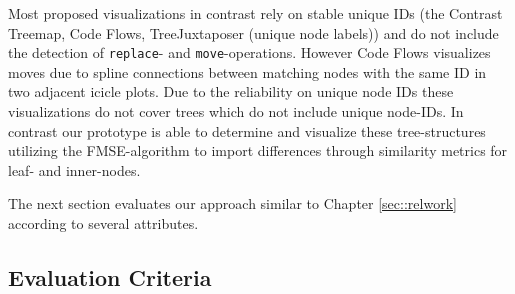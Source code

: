 Most proposed visualizations in contrast rely on stable unique IDs (the Contrast Treemap\cite{tu2007visualizing}, Code Flows\cite{telea2008code}, TreeJuxtaposer\cite{munzner2003treejuxtaposer} (unique node labels)) and do not include the detection of \texttt{replace}- and \texttt{move}-operations. However Code Flows visualizes moves due to spline connections between matching nodes with the same ID in two adjacent icicle plots. Due to the reliability on unique node IDs these visualizations do not cover trees which do not include unique node-IDs. In contrast our prototype is able to determine and visualize these tree-structures utilizing the FMSE-algorithm to import differences through similarity metrics for leaf- and inner-nodes.

The next section evaluates our approach similar to Chapter \ref{sec::relwork} according to several attributes.

\subsection{Evaluation Criteria}

